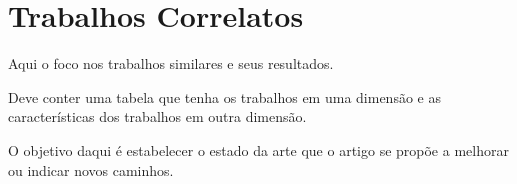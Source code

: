 \section{Trabalhos Correlatos}

Aqui o foco nos trabalhos similares e seus resultados.

Deve conter uma tabela que tenha os trabalhos em uma dimensão e as características dos trabalhos em outra dimensão.

O objetivo daqui é estabelecer o estado da arte que o artigo se propõe a melhorar ou indicar novos caminhos.





